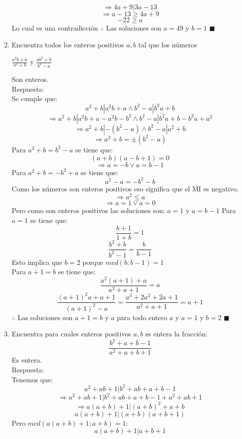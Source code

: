 \documentclass{book}
\begin{document}
\begin{enumerate}
        $$\Rightarrow 4a + 9 |3a- 13$$
        $$ \Rightarrow a- 13 \geq 4a + 9$$
        $$-22 \geq a $$
        Lo cual es una contradicción
        $\therefore$ Las soluciones son $a= 49$ y $   b = 1$ $\blacksquare$  \\
        \item Encuentra todos los enteros positivos $a,b$ tal que los números
        \begin{center}
            $\displaystyle\frac{a^2b+a}{a^2+b}$ y $\displaystyle\frac{ab^2+b}{b^2-a}$
        \end{center}
        Son enteros.\\
        Respuesta:\\
        Se cumple que:
        $$a^2 + b |a^2b + a\wedge b^2 - a| b^2a+ b $$
        $$ \Rightarrow a^2 + b| a^2b + a - a^2b - b^2 \wedge b^2 -a| b^2a + b - b^2a + a^2 $$
        $$ \Rightarrow a^2 + b| -(b^2 - a)  \wedge  b^2 - a |a^2 + b $$
        $$\Rightarrow a^2 + b = \pm(b^2 - a)$$
        Para $a^2 + b = b^2 - a$ se tiene que:
        $$(a + b)(a - b + 1) = 0$$
        $$\Rightarrow a=-b \vee a = b- 1$$
        Para $a^2 + b = -b^2 + a $ se tiene que:
        $$a^2 -a = -b^2 -b$$
        Como los números son enteros positivos eso significa que el MI es negativo.
        $$\Rightarrow a^2 \leq a$$
        $$\Rightarrow a= 1  \vee a= 0$$
        Pero como son enteros positivos las soluciones son:  $a= 1$  y $a= b- 1$
        Para $a= 1$ se tiene que:
        $$\frac{b + 1}{1 + b}=1$$
        $$\frac{b^2 + b}{b^2 - 1} =\frac{b}{b-1}$$
        Esto implica que $b= 2$ porque $mcd(b;b-1) = 1$ \\
        Para $a + 1 =b$ se tiene que:
        $$\frac{a^2(a + 1) + a}{ a^2 + a + 1}=a $$
        $$\frac{{(a + 1)}^2 a + a + 1}{{(a + 1)}^2 - a}=\frac{a^3 + 2a^2 + 2a + 1}{ a^2 + a + 1}= a + 1$$
        $\therefore$ Las soluciones son $a + 1 =b$ y $a$ para todo entero $a$ y $a= 1$ y $b= 2$ $\blacksquare$ \\
        \item  Encuentra para cuales enteros positivos $a,b$ es entera la fracción:
        $$\frac{b^2+a+b-1}{a^2+a+b+1}$$
        Es entera.\\
        Respuesta:\\
        Tenemos que: $$a^2 + ab + 1| b^2 + ab + a + b - 1$$
        $$\Rightarrow a^2 + ab + 1| b^2 + ab + a + b - 1 + a^2 + ab + 1 $$
        $$\Rightarrow a(a + b) + 1 |{(a + b)}^2 + a + b$$
        $$a(a + b) + 1| (a + b)(a + b + 1)$$
        Pero $mcd(a(a + b) + 1;a + b) = 1$:
        $$a(a + b) + 1| a + b + 1 $$

\end{enumerate}
\end{document}
